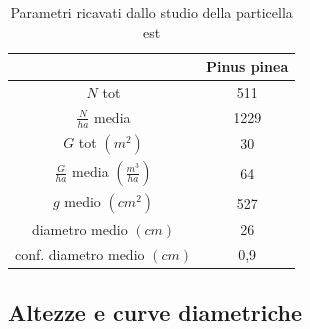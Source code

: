 \begin{table}[H]
  \caption{Parametri ricavati dallo studio della particella est}
    \centering
    \begin{tabular}{cc}
     \toprule
       & Pinus pinea  \\
       \midrule
        $N$ tot & 511 \\
        $\frac{N}{ha}$ media & 1229 \\
         $G$ tot $(m^2)$ & 30 \\
        $\frac{G}{ha}$ media $(\frac{m^3}{ha})$ & 64 \\
        $g$ medio $(cm^2)$ & 527 \\
        diametro medio  $(cm)$ & 26 \\
        conf. diametro medio $(cm)$ & 0,9 \\
       \bottomrule
        \end{tabular}
    \label{tab:tab_relascopia_est}
\end{table}



\subsection{Altezze e curve diametriche}
